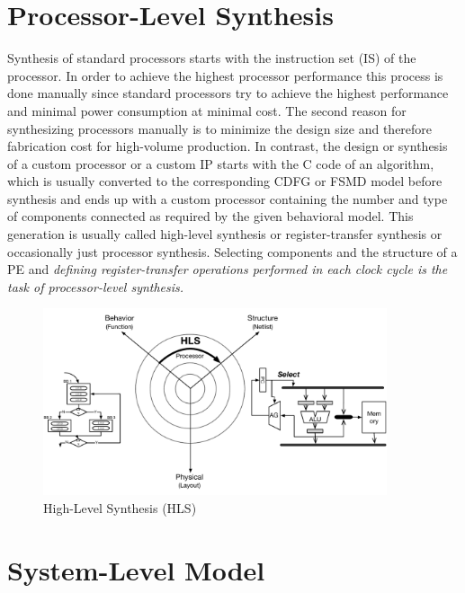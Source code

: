 \section{Processor-Level Synthesis}

Synthesis of standard processors starts with the instruction set (IS) of the processor.
In order to achieve the highest processor performance this process is done manually since standard processors try to achieve the highest performance and minimal power consumption at minimal cost.
The second reason for synthesizing processors manually is to minimize the design size and therefore fabrication cost for high-volume production.
In contrast, the design or synthesis of a custom processor or a custom IP starts with the C code of an algorithm, which is usually converted to the corresponding CDFG or FSMD model before synthesis and ends up with a custom processor containing the number and type of components connected as required by the given behavioral model.
This generation is usually called high-level synthesis or register-transfer synthesis or occasionally just processor synthesis.
Selecting components and the structure of a PE and \emph{defining register-transfer operations performed in each clock cycle is the task of processor-level synthesis.}

\begin{figure}[h]
    \centering
    \includegraphics[width=0.9\textwidth]{figures/Introduction/processor-synthesis.pdf}
    \caption{High-Level Synthesis (HLS)}
    \label{fig:proc_synthesis}
\end{figure}


\section{System-Level Model}

